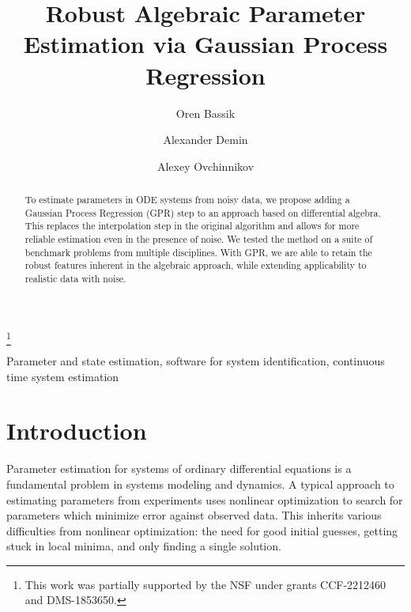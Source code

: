 \documentclass{ifacconf}
\begin{document}
	\begin{frontmatter}
		
		\title{Robust Algebraic Parameter Estimation via Gaussian Process Regression} 
		
		\thanks[footnoteinfo]{This work was partially supported by the NSF under grants CCF-2212460 and DMS-1853650.} 

		
		\author[First]{Oren Bassik}
		\author[Second]{Alexander Demin} 
		\author[Third]{Alexey Ovchinnikov}
		
\address[First]{Graduate Center, City University of New York, 
	365 Fifth Avenue, New York, NY 10016, USA (e-mail: obassik@gradcenter.cuny.edu).}
\address[Second]{HSE University, Moscow, Russia (e-mail: asdemin\_2@edu.hse.ru).}
\address[Third]{Department of Mathematics, 
	CUNY Queens College, and Ph.D. Programs in Mathematics and Computer Science, CUNY Graduate Center, New York, NY, USA (e-mail: aovchinnikov@qc.cuny.edu).}
		
		\begin{abstract}                %
			To estimate parameters in ODE systems from noisy data, we propose adding a Gaussian Process Regression (GPR) step to an approach based on differential algebra.  This replaces the interpolation step in the original algorithm and allows for more reliable estimation even in the presence of noise.  We tested the method on a suite of benchmark problems from multiple disciplines.  With GPR, we are able to retain the robust features inherent in the algebraic approach, while extending applicability to realistic data with noise.
		\end{abstract}
		
		\begin{keyword}
			Parameter and state estimation, software for system identification, continuous time system estimation
		\end{keyword}
		
	\end{frontmatter}
	
	\section{Introduction}
	Parameter estimation for systems of ordinary differential equations is a fundamental problem in systems modeling and dynamics.  A typical approach to estimating parameters from experiments uses nonlinear optimization to search for parameters which minimize error against observed data.  This inherits various difficulties from nonlinear optimization: the need for good initial guesses, getting stuck in local minima, and only finding a single solution.  
	
\end{document}
